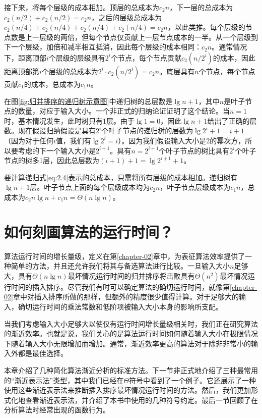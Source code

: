 \documentclass[lang=cn,newtx,10pt,scheme=chinese]{elegantbook}
\begin{document}
接下来，将每个层级的成本相加。顶层的总成本为$c_2n$，下一层的总成本为$c_2(n / 2)+c_2(n / 2)=c_2 n$，之后的层级总成本为$c_2(n / 4)+c_2(n / 4)+c_2(n / 4)+c_2(n / 4)=c_2 n$，以此类推。每个层级的节点数是上一层级的两倍，但每个节点仅贡献上一层节点成本的一半。从一个层级到下一个层级，加倍和减半相互抵消，因此每个层级的成本相同：$c_2n$。通常情况下，距离顶部$i$个层级的层级具有$2^i$个节点，每个节点贡献$c_2(n/2^i)$的成本，因此距离顶部第$i$个层级的总成本为$2^i \cdot c_2\left(n / 2^i\right)=c_2 n$。底层具有$n$个节点，每个节点贡献$c_1$的成本，总成本为$c_1n$。

在图\ref{fig:归并排序的递归树示意图}中递归树的总层数是$\lg n+1$，其中$n$是叶子节点的数量，对应于输入大小。一个非正式的归纳论证证明了这个结论。当$n=1$时，基本情况发生，此时树只有1层。由于$\lg 1 = 0$，因此$\lg n + 1$给出了正确的层数。现在假设归纳假设是具有$2^i$个叶子节点的递归树的层数为$\lg 2^i+1=i+1$（因为对于任何$i$值，我们有$\lg 2^i=i$）。因为我们假设输入大小是2的幂次方，所以要考虑的下一个输入大小是$2^{i+1}$。具有$n=2^{i+1}$个叶子节点的树比具有$2^i$个叶子节点的树多1层，因此总层数为$(i+1)+1=\lg{2^{i+1}}+1$。

要计算递归式\eqref{eq:2.4}表示的总成本，只需将所有层级的成本相加。递归树有$\lg n + 1$层。叶子节点上面的每个层级成本均为$c_2n$，叶子节点层级成本为$c_1n$，总成本为$c_2 n \lg n + c_1 n = \Theta(n \lg n)$。

\chapter{如何刻画算法的运行时间？}\label{chapter-03}

算法运行时间的增长量级，定义在第\ref{chapter-02}章中，为表征算法效率提供了一种简单的方法，并且还允许我们将其与备选算法进行比较。一旦输入大小$n$足够大，具有$\Theta(n\lg n)$最坏情况运行时间的归并排序将击败具有$\Theta(n^2)$最坏情况运行时间的插入排序。尽管我们有时可以确定算法的确切运行时间，就像第\ref{chapter-02}章中对插入排序所做的那样，但额外的精度很少值得计算。对于足够大的输入，确切运行时间的乘法常数和低阶项被输入大小本身的影响所支配。

当我们考虑输入大小足够大以使仅有运行时间增长量级相关时，我们正在研究算法的渐近效率。也就是说，我们关心的是算法运行时间如何随着输入大小在极限情况下随着输入大小无限增加而增加。通常，渐近效率更高的算法对于除非非常小的输入外都是最佳选择。

本章介绍了几种简化算法渐近分析的标准方法。下一节非正式地介绍了三种最常用的``渐近表示法''类型，其中我们已经在$\Theta$符号中看到了一个例子。它还展示了一种使用这些渐近表示法来推断插入排序最坏情况运行时间的方法。然后，我们更加形式化地查看渐近表示法，并介绍了本书中使用的几种符号约定。最后一节回顾了在分析算法时经常出现的函数行为。
\end{document}
